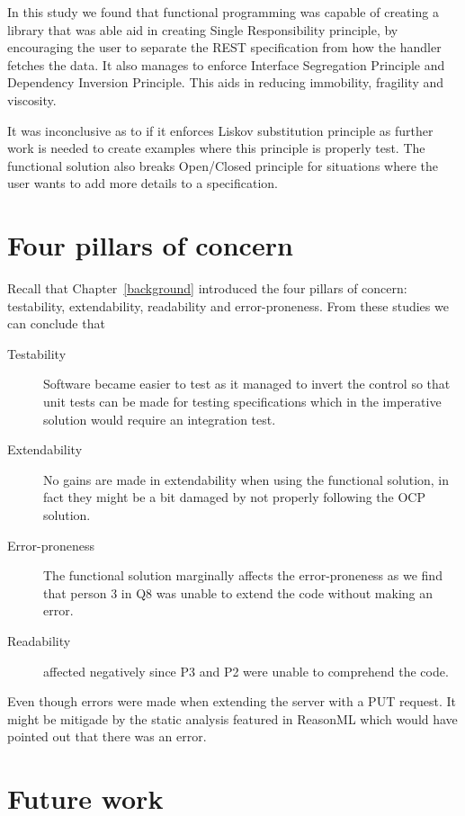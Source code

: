 In this study we found that functional programming was capable of creating a
library that was able aid in creating Single Responsibility principle, by
encouraging the user to separate the REST specification from how the handler
fetches the data. It also manages to enforce Interface Segregation Principle and
Dependency Inversion Principle. This aids in reducing immobility, fragility and
viscosity.

It was inconclusive as to if it enforces Liskov substitution principle as
further work is needed to create examples where this principle is properly
test. The functional solution also breaks Open/Closed principle for situations
where the user wants to add more details to a specification.

\section{Four pillars of concern}

Recall that Chapter~\ref{background} introduced the four pillars of concern:
testability, extendability, readability and error-proneness. From these studies
we can conclude that

\begin{description}
	\item[Testability] Software became easier to test as it managed to invert
	the control so that unit tests can be made for testing specifications
	which in the imperative solution would require an integration test.
	\item[Extendability] No gains are made in extendability when using the 
	functional solution, in fact they might be a bit damaged by not properly
	following the OCP solution.
	\item[Error-proneness] The functional solution marginally affects the 
	error-proneness as we find that person 3 in Q8 was unable to extend the code without
	making an error.
	\item[Readability] affected negatively since P3 and P2 were
unable to comprehend the code.
\end{description}

Even though errors were made when extending the server with a PUT request. It
might be mitigade by the static analysis featured in ReasonML which would have
pointed out that there was an error.

\section{Future work}\label{futurework}

